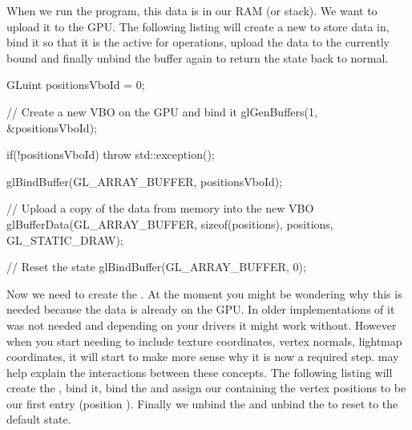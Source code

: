 \documentclass[10pt]{article}
\begin{document}
When we run the program, this data is in our RAM (or stack). We
want to upload it to the GPU. The following listing will create a new
 to store data in, bind it so that it is the
active  for operations, upload the data to the currently bound
 and finally unbind the buffer again to return the state back
to normal.

\begin{Listing}

  GLuint positionsVboId = 0;

  // Create a new VBO on the GPU and bind it
  glGenBuffers(1, &positionsVboId);

  if(!positionsVboId)
  {
    throw std::exception();
  }

  glBindBuffer(GL_ARRAY_BUFFER, positionsVboId);

  // Upload a copy of the data from memory into the new VBO
  glBufferData(GL_ARRAY_BUFFER, sizeof(positions), positions, GL_STATIC_DRAW);

  // Reset the state
  glBindBuffer(GL_ARRAY_BUFFER, 0);

\end{Listing}


Now we need to create the . At the
moment you might be wondering why this is needed because the data is
already on the GPU.  In older implementations of  it was
not needed and depending on your drivers it might work without. However
when you start needing to include texture coordinates, vertex normals,
lightmap coordinates, it will start to make more sense why it is now
a required step.  may help explain the interactions between
these concepts. The following listing will create the , bind
it, bind the  and assign our  containing the vertex
positions to be our first entry (position ). Finally we unbind
the  and unbind the  to reset to the default state.
\end{document}
